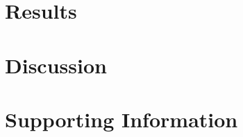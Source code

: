\documentclass[12pt]{article}
\begin{document}
\section{Results}
\section{Discussion}


  
  \setlength{\parskip}{1em}
\clearpage




\section*{Supporting Information}

\setcounter{figure}{0}
\setcounter{table}{0}


%
\end{document}

